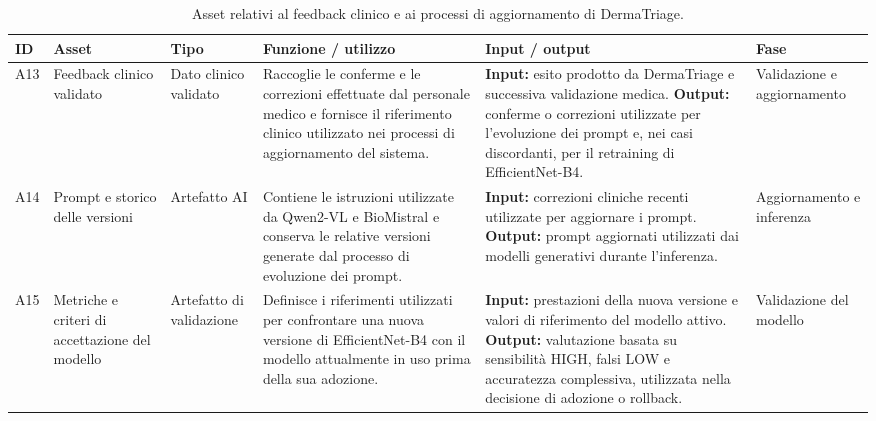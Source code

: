 \begin{table}[H]
    \centering
    \small
    \setlength{\tabcolsep}{4pt}
    \renewcommand{\arraystretch}{1.08}

    \begin{tabularx}{\textwidth}{
        >{\raggedright\arraybackslash}p{0.6cm}
        >{\raggedright\arraybackslash}p{2.5cm}
        >{\raggedright\arraybackslash}p{1.6cm}
        X
        X
        >{\raggedright\arraybackslash}p{1.8cm}
    }
        \toprule

        \textbf{ID} &
        \textbf{Asset} &
        \textbf{Tipo} &
        \textbf{Funzione / utilizzo} &
        \textbf{Input / output} &
        \textbf{Fase} \\

        \midrule

        A13 &
        Feedback clinico validato &
        Dato clinico validato &
        Raccoglie le conferme e le correzioni effettuate dal personale
        medico e fornisce il riferimento clinico utilizzato nei processi
        di aggiornamento del sistema. &
        \textbf{Input:} esito prodotto da DermaTriage e successiva
        validazione medica.
        \textbf{Output:} conferme o correzioni utilizzate per
        l'evoluzione dei prompt e, nei casi discordanti, per il retraining
        di EfficientNet-B4. &
        Validazione e aggiornamento \\

        \midrule

        A14 &
        Prompt e storico delle versioni &
        Artefatto AI &
        Contiene le istruzioni utilizzate da Qwen2-VL e BioMistral e
        conserva le relative versioni generate dal processo di evoluzione
        dei prompt. &
        \textbf{Input:} correzioni cliniche recenti utilizzate per
        aggiornare i prompt.
        \textbf{Output:} prompt aggiornati utilizzati dai modelli
        generativi durante l'inferenza. &
        Aggiorna\-mento e inferenza \\

        \midrule

        A15 &
        Metriche e criteri di accettazione del modello &
        Artefatto di validazione &
        Definisce i riferimenti utilizzati per confrontare una nuova
        versione di EfficientNet-B4 con il modello attualmente in uso
        prima della sua adozione. &
        \textbf{Input:} prestazioni della nuova versione e valori di
        riferimento del modello attivo.
        \textbf{Output:} valutazione basata su sensibilità HIGH,
        falsi LOW e accuratezza complessiva, utilizzata nella decisione
        di adozione o rollback. &
        Validazione del modello \\

        \bottomrule
    \end{tabularx}

    \caption{Asset relativi al feedback clinico e ai processi di aggiornamento di DermaTriage.}
    \label{tab:asset-feedback-aggiornamento}
\end{table}

